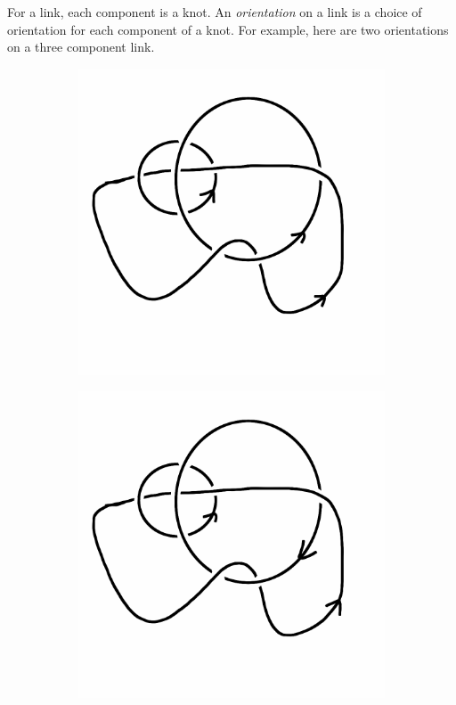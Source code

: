 \documentclass[12pt,letterpaper]{article}
\theoremstyle{definition}
\begin{document}
For a link, each component is a knot. 
An \emph{orientation} on a link is a choice of orientation for each component of a knot.
For example, here are two orientations on a three component link.

\begin{figure}[h]
    \centering
    \begin{subfigure}{.3\textwidth}
        \centering
        \includegraphics[width=\textwidth]{rgp11pics/threelinka.png}
    \end{subfigure}
    \hspace{1cm}
    \begin{subfigure}{.3\textwidth}
        \centering         
        \includegraphics[width=\textwidth]{rgp11pics/threelinkb.png}

\end{subfigure}
\end{figure}
\end{document}
